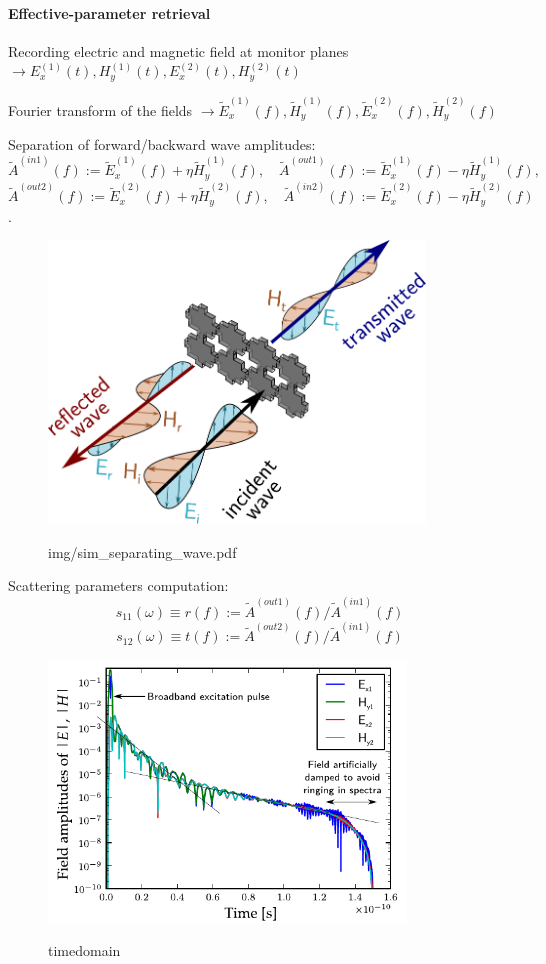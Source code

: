 
\paragraph{Effective-parameter retrieval} %
Recording electric and magnetic field at monitor planes $\rightarrow E_{x}^{(1)}(t), H_{y}^{(1)}(t), E_{x}^{(2)}(t), H_{y}^{(2)}(t)$

Fourier transform of the fields $\rightarrow \tilde E_{x}^{(1)}(f), \tilde H_{y}^{(1)}(f), \tilde E_{x}^{(2)}(f), \tilde H_{y}^{(2)}(f)$ 

Separation of forward/backward wave amplitudes: \\
$$\tilde A^{(in 1)}(f)  := \tilde E_{x}^{(1)}(f) + \eta \tilde H_{y}^{(1)}(f), \quad \tilde A^{(out 1)}(f) := \tilde E_{x}^{(1)}(f) - \eta \tilde H_{y}^{(1)}(f),$$
$$\tilde A^{(out 2)}(f) := \tilde E_{x}^{(2)}(f) + \eta \tilde H_{y}^{(2)}(f), \quad \tilde A^{(in 2)}(f)  := \tilde E_{x}^{(2)}(f) - \eta \tilde H_{y}^{(2)}(f)$$. 
\begin{figure}[h] \caption{img/sim\_separating\_wave.pdf}  \centering \includegraphics[width=10cm]{img/sim_separating_wave.pdf} \label{fg_}\end{figure}


Scattering parameters computation:\\
$$s_{11}(\omega) \equiv r(f) := \tilde A^{(out 1)}(f) / \tilde A^{(in 1)}(f)$$
$$s_{12}(\omega) \equiv t(f) := \tilde A^{(out 2)}(f) / \tilde A^{(in 1)}(f)$$

\begin{figure}[h] \caption{timedomain} \centering \includegraphics[width=9.5cm]{img/sim_timedomain_debug.pdf} \label{fg_} \end{figure}

